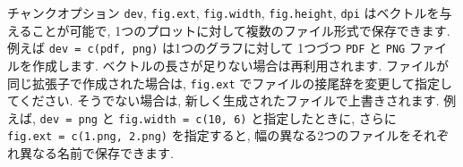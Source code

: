 \documentclass[
  lualatex,ja=standard,jafont=noto-otf]{bxjsreport}
\begin{document}
チャンクオプション \texttt{dev}, \texttt{fig.ext}, \texttt{fig.width},
\texttt{fig.height}, \texttt{dpi} はベクトルを与えることが可能で,
1つのプロットに対して複数のファイル形式で保存できます. 例えば
\texttt{dev\ =\ c(\textquotesingle{}pdf\textquotesingle{},\ \textquotesingle{}png\textquotesingle{})}
は1つのグラフに対して 1つづつ \texttt{PDF} と \texttt{PNG}
ファイルを作成します. ベクトルの長さが足りない場合は再利用されます.
ファイルが同じ拡張子で作成された場合は, \texttt{fig.ext}
でファイルの接尾辞を変更して指定してください. そうでない場合は,
新しく生成されたファイルで上書きされます. 例えば,
\texttt{dev\ =\ \textquotesingle{}png\textquotesingle{}} と
\texttt{fig.width\ =\ c(10,\ 6)} と指定したときに, さらに
\texttt{fig.ext\ =\ c(\textquotesingle{}1.png\textquotesingle{},\ \textquotesingle{}2.png\textquotesingle{})}
を指定すると, 幅の異なる2つのファイルをそれぞれ異なる名前で保存できます.
\end{document}
